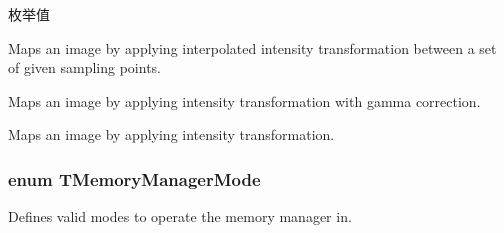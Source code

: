 \begin{Desc}
\item[枚举值]\par
\begin{description}
\item[{\em 
\hypertarget{group___common_interface_gga622d4fe4aa7b262752e9101c78f87f57ac163fa75ceb235ebfe344a9cdb70fc61}{L\+U\+Tm\+Interpolated}\label{group___common_interface_gga622d4fe4aa7b262752e9101c78f87f57ac163fa75ceb235ebfe344a9cdb70fc61}
}]Maps an image by applying interpolated intensity transformation between a set of given sampling points. \item[{\em 
\hypertarget{group___common_interface_gga622d4fe4aa7b262752e9101c78f87f57a7d07fe5ac753ed62eddd71fbc5483550}{L\+U\+Tm\+Gamma}\label{group___common_interface_gga622d4fe4aa7b262752e9101c78f87f57a7d07fe5ac753ed62eddd71fbc5483550}
}]Maps an image by applying intensity transformation with gamma correction. \item[{\em 
\hypertarget{group___common_interface_gga622d4fe4aa7b262752e9101c78f87f57a592d6b088911e6974709ba3efb2ad1e8}{L\+U\+Tm\+Direct}\label{group___common_interface_gga622d4fe4aa7b262752e9101c78f87f57a592d6b088911e6974709ba3efb2ad1e8}
}]Maps an image by applying intensity transformation. \end{description}
\end{Desc}
\hypertarget{group___common_interface_ga36f8c9739d1454dc75f980421ce5a6b6}{
\subsubsection[{T\+Memory\+Manager\+Mode}]{\setlength{\rightskip}{0pt plus 5cm}enum {\bf T\+Memory\+Manager\+Mode}}}\label{group___common_interface_ga36f8c9739d1454dc75f980421ce5a6b6}


Defines valid modes to operate the memory manager in. 

